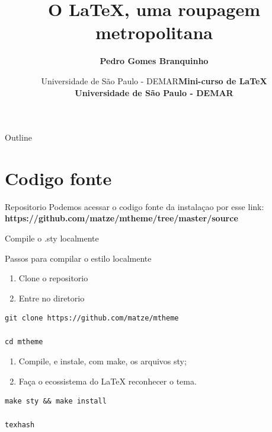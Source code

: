 \documentclass[bigger]{beamer}
\date{  Universidade de São Paulo - DEMAR}
\title{O \LaTeX{}, uma roupagem metropolitana}
\author[Branquinho]{\textbf{Pedro Gomes Branquinho \\ \text{\scriptsize{pedro.branquinho@usp.br}}}}
\date[EEL-USP]{\textbf{\scriptsize{Mini-curso de \LaTeX} \\ Universidade de São Paulo - DEMAR}}
\begin{document}
\maketitle
\begin{frame}{Outline}
\tableofcontents
\end{frame}

{

\section{Codigo fonte}
\label{sec:org8a3d9ee}
\begin{frame}[label={sec:orgf21036e}]{Repositorio}
Podemos acessar o codigo fonte da instalaçao por esse link:
\textbf{https://github.com/matze/mtheme/tree/master/source}

\transdissolve
\end{frame}
\begin{frame}[label={sec:orgd99905e},fragile]{Compile o .sty localmente}
 \begin{block}{Passos para compilar o \alert{estilo} localmente}
\begin{enumerate}[<1->]
\item \small{Clone o repositorio}
\item \small{Entre no diretorio}
\end{enumerate}
\begin{verbatim}
git clone https://github.com/matze/mtheme

cd mtheme
\end{verbatim}

\begin{enumerate}[<2->]
\item \small Compile, e instale, com \alert{make}, os arquivos sty;
\item \small{Faça o ecossistema do LaTeX reconhecer o tema.}
\end{enumerate}
\begin{verbatim}
make sty && make install

texhash
\end{verbatim}
\end{block}
\end{frame}

}
\end{document}
